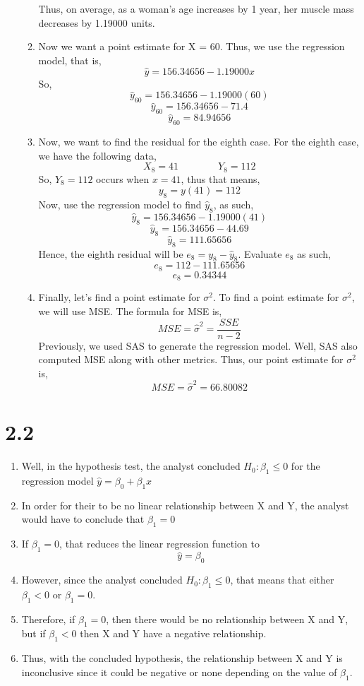 \documentclass{article}
\begin{document}
\begin{enumerate}[label = \alph*)]
\begin{enumerate}[label = \arabic*)]
			Thus, on average, as a woman's age increases by 1 year, her muscle mass decreases by 1.19000 units.
			\item Now we want a point estimate for X = 60.
			Thus, we use the regression model, that is,
			\[\hat{y} = 156.34656 - 1.19000x\]
			So,
			\[\hat{y}_{60} = 156.34656 - 1.19000(60)\]
			\[\hat{y}_{60} = 156.34656 - 71.4\]
			\[\hat{y}_{60} = 84.94656\]
			\item Now, we want to find the residual for the eighth case. 
			For the eighth case, we have the following data,
			\[X_8 = 41 \qquad \qquad Y_8 = 112\]
			So, $Y_8 = 112$ occurs when $x = 41$, thus that means,
			\[y_{8} = y(41) = 112\]
			Now, use the regression model to find $\hat{y}_{8}$, as such,
			\[\hat{y}_{8} = 156.34656 - 1.19000(41)\]
			\[\hat{y}_{8} = 156.34656 - 44.69\]
			\[\hat{y}_{8} = 111.65656\]
			Hence, the eighth residual will be $e_8 = y_{8}-\hat{y}_{8}$.
			Evaluate $e_8$ as such,
			\[e_8 = 112 - 111.65656\]
			\[e_8 = 0.34344\]
			\item Finally, let's find a point estimate for $\sigma^2$.
			To find a point estimate for $\sigma^2$, we will use MSE.
			The formula for MSE is,
			\[MSE = \hat{\sigma}^2 = \frac{SSE}{n-2}\]
			Previously, we used SAS to generate the regression model. Well, SAS also computed MSE along with other metrics.
			Thus, our point estimate for $\sigma^2$ is,
			\[MSE = \hat{\sigma}^2 = 66.80082\]			
		\end{enumerate}
	\end{enumerate}

\section*{2.2}
	\begin{enumerate}
		\item Well, in the hypothesis test, the analyst concluded $H_0: \beta_1 \leq 0$ for the regression model $\hat{y} = \beta_0 + \beta_1x$
		\item In order for their to be no linear relationship between X and Y, the analyst would have to conclude that $\beta_1 = 0$
		\item If $\beta_1 = 0$, that reduces the linear regression function to 
		\[\hat{y} = \beta_0\]
		\item However, since the analyst concluded $H_0: \beta_1 \leq 0$, that 
		means that either $\beta_1 < 0$ or $\beta_1 = 0$.
		\item Therefore, if $\beta_1 = 0$, then there would be no relationship between X and Y, but if $\beta_1 < 0$ then X and Y have a negative relationship.
		\item Thus, with the concluded hypothesis, the relationship between X and Y is inconclusive since it could be negative or none depending on the value of $\beta_1$.
	\end{enumerate}
\end{document}
